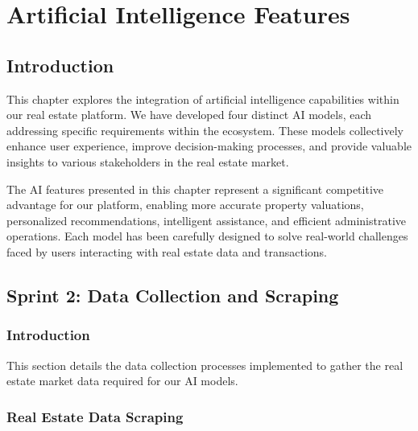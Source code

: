 \chapter{Artificial Intelligence Features}


\section*{Introduction}

This chapter explores the integration of artificial intelligence capabilities within our real estate platform. We have developed four distinct AI models, each addressing specific requirements within the ecosystem. These models collectively enhance user experience, improve decision-making processes, and provide valuable insights to various stakeholders in the real estate market.

The AI features presented in this chapter represent a significant competitive advantage for our platform, enabling more accurate property valuations, personalized recommendations, intelligent assistance, and efficient administrative operations. Each model has been carefully designed to solve real-world challenges faced by users interacting with real estate data and transactions.

\section{Sprint 2: Data Collection and Scraping}
\subsection*{Introduction}
This section details the data collection processes implemented to gather the real estate market data required for our AI models. 

\subsection{Real Estate Data Scraping}
